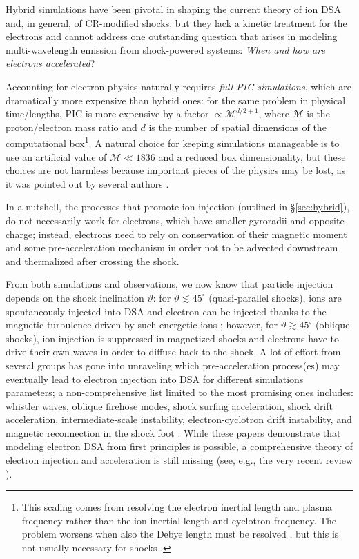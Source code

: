 \documentclass[varenna]{cimento}
\newcommand\thbn{\vartheta}
\renewcommand{\deg}{^{\circ}}
\begin{document}
Hybrid simulations have been pivotal in shaping the current theory of ion DSA and, in general, of CR-modified shocks, but they lack a kinetic treatment for the electrons and cannot address one  outstanding question that arises in modeling multi-wavelength emission from shock-powered systems: \emph{When and how are electrons accelerated}?


Accounting for electron physics naturally requires \emph{full-PIC simulations}, which are dramatically more expensive than hybrid ones:
for the same problem in physical time/lengths, PIC is more expensive by a factor $\propto \mathcal M^{d/2+1}$, where $\mathcal M$ is the proton/electron mass ratio and $d$ is the number of spatial dimensions of the computational box\footnote{This scaling comes from resolving the electron inertial length and plasma frequency rather than the ion inertial length and cyclotron frequency. The problem worsens when also the Debye length must be resolved \cite{shalaby+18}, but this is not usually necessary for shocks \cite{sironi+11}.}. 
A natural choice for keeping simulations manageable is to use an artificial value of $\mathcal M\ll 1836$ and a reduced box dimensionality, but these choices are not harmless because important pieces of the physics may be lost, as it was pointed out by several authors \cite{riquelme+11,xu+20}.

In a nutshell, the processes that promote ion injection (outlined in \S\ref{sec:hybrid}), do not necessarily work for electrons, which have smaller gyroradii and opposite charge;
instead, electrons need to rely on conservation of their magnetic moment \cite{ball+01} and some  pre-acceleration mechanism in order not to be advected downstream and thermalized after crossing the shock. 

From both simulations and observations, we now know that particle injection depends on the shock inclination $\thbn$: 
for $\vartheta\lesssim 45\deg$ (quasi-parallel shocks), ions are spontaneously injected into DSA and electron can be injected thanks to the magnetic turbulence driven by such energetic ions \cite{park+15,crumley+19}; 
however, for  $\vartheta\gtrsim 45\deg$ (oblique shocks), ion injection is suppressed in magnetized shocks \cite{caprioli+15} and electrons have to drive their own waves in order to diffuse back to the shock.
A lot of effort from several groups has gone into unraveling which pre-acceleration process(es) may eventually lead to electron injection into DSA for different simulations parameters;
a non-comprehensive list limited to the most promising ones includes: whistler waves, oblique firehose modes, shock surfing acceleration, shock drift acceleration, intermediate-scale instability, electron-cyclotron drift instability, and magnetic reconnection in the shock foot
\cite{lembege02a,krasnoselskikh95a,lembege+04,amano+07,amano+09a, amano+09b,amano+10,guo+14a,guo+14b,savoini+13,matsumoto+15,matsukiyo+06, bohdan+19a,bohdan+19b,bohdan+20a,bohdan+20b,marcowith+16,shalaby+22,fiuza+20,wang+22,morris+22,morris+23, shimada+00,ha+21,ha+22,ha+23,kang+19,kim+21}.
While these papers demonstrate that modeling electron DSA from first principles is possible, a comprehensive theory of electron injection and acceleration is still missing (see, e.g., the very recent review \cite{amano+22}).
\end{document}
